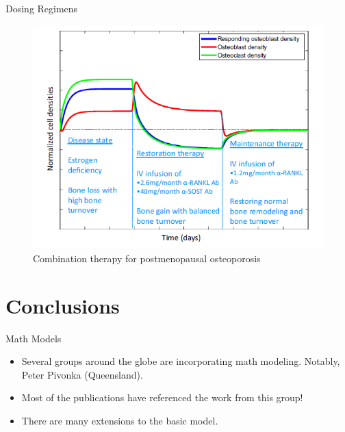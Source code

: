 \documentclass{beamer}
\begin{document}
\begin{frame}{Dosing Regimens}
\begin{figure}[h]
	\centering
		\includegraphics[scale=0.45]{../Figures/fig_lemaire_fig18.png}
	\caption{Combination therapy for postmenopausal osteoporosis}
\end{figure}		
\end{frame}

\section{Conclusions}

\begin{frame}{Math Models}
	\begin{itemize}
		\item Several groups around the globe are incorporating math modeling. Notably, Peter Pivonka (Queensland).
		\item Most of the publications have referenced the work from this group!
		\item There are many extensions to the basic model. 
	\end{itemize}
\end{frame}
\end{document}
